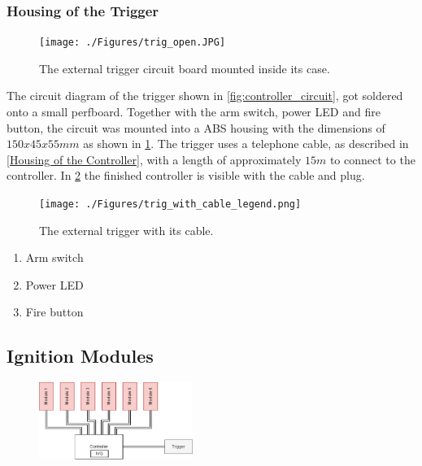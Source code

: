 \subsubsection{Housing of the Trigger}

\begin{figure}[!ht]
    \centering
    \texttt{[image: ./Figures/trig\_open.JPG]}
    \caption{The external trigger circuit board mounted inside its case.}
    \label{fig:trig_open}     
\end{figure}

\noindent The circuit diagram of the trigger shown in \cref{fig:controller_circuit}, got soldered onto a small perfboard. Together with the arm switch, power LED and fire button, the circuit was mounted into a ABS housing with the dimensions of $150x45x55mm$ as shown in \cref{fig:trig_open}. The trigger uses a telephone cable, as described in \cref{Housing of the Controller}, with a length of approximately $15m$ to connect to the controller. In \cref{fig:trig_with_cable_legend} the finished controller is visible with the cable and plug.

\begin{figure}[!ht]
    \centering
    \texttt{[image: ./Figures/trig\_with\_cable\_legend.png]}
    \caption{The external trigger with its cable.}
    \label{fig:trig_with_cable_legend}     
\end{figure}

\begin{enumerate}
	\item Arm switch
	\item Power LED
	\item Fire button
\end{enumerate}

\pagebreak

\subsection{Ignition Modules}
\label{Ignition Modules}

\begin{figure}[!ht]
    \centering
    \includegraphics[width=5cm]{./Figures/concept_modules.png} 
\end{figure}

